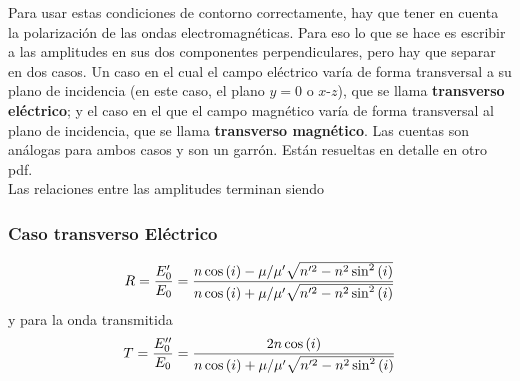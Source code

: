 Para usar estas condiciones de contorno correctamente, hay que tener en cuenta la polarización de las ondas electromagnéticas. Para eso lo que se hace es escribir a las amplitudes en sus dos componentes perpendiculares, pero hay que separar en dos casos. Un caso en el cual el campo eléctrico varía de forma transversal a su plano de incidencia (en este caso, el plano $y = 0$ o $x$-$z$), que se llama \textbf{transverso eléctrico}; y el caso en el que el campo magnético varía de forma transversal al plano de incidencia, que se llama \textbf{transverso magnético}. Las cuentas son análogas para ambos casos y son un garrón. Están resueltas en detalle en otro pdf.\\
\indent Las relaciones entre las amplitudes terminan siendo
\subsubsection*{Caso transverso Eléctrico}
\begin{equation}
    R 
    =
    \frac{E_{0}'}{E_{0}} 
    =
    \frac%
    {%
        n\cos{(i)}
        -
        \mu /\mu'
        \sqrt{n'^2- n^2 \sin^{2}{(i)}}
    }
    {%
        n\cos{(i)}
        +
        \mu/\mu' 
        \sqrt{n'^2 -n^2 \sin^{2}{(i)}}
    }
        \label{ec:REr}
\end{equation}
y para la onda transmitida
\begin{equation}
    T
    =
    \frac{E_{0}''}{E_{0}} 
    =
    \frac
    {%
        2n\cos{(i)}
    }
    {%
        n\cos{(i)}
        +
        \mu/\mu' 
        \sqrt{n'^2- n^2 \sin^{2}{(i)}}
    }
        \label{ec:TEt}
\end{equation}

